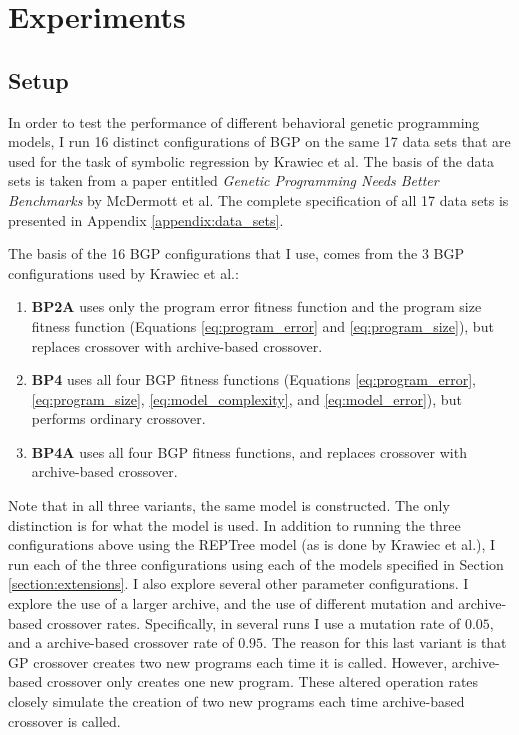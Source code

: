 \chapter{Experiments}
\label{chap:experiments}

\section{Setup}
\label{section:setup}
In order to test the performance of different behavioral genetic programming models, I run 16 distinct configurations of BGP on the same 17 data sets that are used for the task of symbolic regression by Krawiec et al.  The basis of the data sets is taken from a paper entitled \textit{Genetic Programming Needs Better Benchmarks} by McDermott et al. \cite{benchmarks} The complete specification of all 17 data sets is presented in Appendix \ref{appendix:data_sets}.

The basis of the 16 BGP configurations that I use, comes from the 3 BGP configurations used by Krawiec et al.:

\begin{enumerate}[noitemsep]
\item \textbf{BP2A} uses only the program error fitness function and the program size fitness function (Equations \ref{eq:program_error} and \ref{eq:program_size}), but replaces crossover with archive-based crossover.
\item \textbf{BP4} uses all four BGP fitness functions (Equations \ref{eq:program_error}, \ref{eq:program_size}, \ref{eq:model_complexity}, and \ref{eq:model_error}), but performs ordinary crossover.
\item \textbf{BP4A} uses all four BGP fitness functions, and replaces crossover with archive-based crossover.
\end{enumerate}


Note that in all three variants, the same model is constructed.  The only distinction is for what the model is used.  In addition to running the three configurations above using the REPTree model (as is done by Krawiec et al.), I run each of the three configurations using each of the models specified in Section \ref{section:extensions}.  I also explore several other parameter configurations. I explore the use of a larger archive, and the use of different mutation and archive-based crossover rates.  Specifically, in several runs I use a mutation rate of $0.05$, and a archive-based crossover rate of $0.95$.  The reason for this last variant is that GP crossover creates two new programs each time it is called.  However, archive-based crossover only creates one new program.  These altered operation rates closely simulate the creation of two new programs each time archive-based crossover is called.


